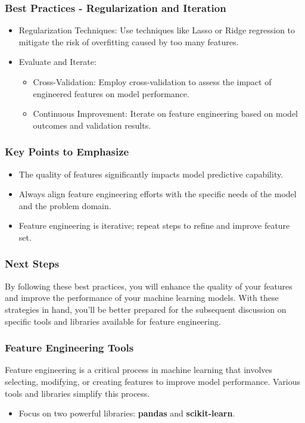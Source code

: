 \documentclass[aspectratio=169]{beamer}
\begin{document}
\begin{frame}
    \frametitle{Best Practices - Regularization and Iteration}
    \begin{itemize}
        \item Regularization Techniques: Use techniques like Lasso or Ridge regression to mitigate the risk of overfitting caused by too many features.
        \item Evaluate and Iterate:
        \begin{itemize}
            \item Cross-Validation: Employ cross-validation to assess the impact of engineered features on model performance.
            \item Continuous Improvement: Iterate on feature engineering based on model outcomes and validation results.
        \end{itemize}
    \end{itemize}
\end{frame}

\begin{frame}
    \frametitle{Key Points to Emphasize}
    \begin{itemize}
        \item The quality of features significantly impacts model predictive capability.
        \item Always align feature engineering efforts with the specific needs of the model and the problem domain.
        \item Feature engineering is iterative; repeat steps to refine and improve feature set.
    \end{itemize}
\end{frame}

\begin{frame}
    \frametitle{Next Steps}
    By following these best practices, you will enhance the quality of your features and improve the performance of your machine learning models. With these strategies in hand, you'll be better prepared for the subsequent discussion on specific tools and libraries available for feature engineering.
\end{frame}

\begin{frame}[fragile]
    \frametitle{Feature Engineering Tools}
    Feature engineering is a critical process in machine learning that involves selecting, modifying, or creating features to improve model performance. Various tools and libraries simplify this process.
    
    \begin{itemize}
        \item Focus on two powerful libraries: \textbf{pandas} and \textbf{scikit-learn}.
    \end{itemize}
\end{frame}
\end{document}
